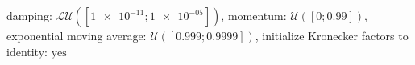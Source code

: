 damping: $\mathcal{LU}([\num[scientific-notation=true]{1e-11}; \num[scientific-notation=true]{1e-05}])$, momentum: $\mathcal{U}([\num[scientific-notation=false]{0}; \num[scientific-notation=true]{0.99}])$, exponential moving average: $\mathcal{U}([\num[scientific-notation=true]{0.999}; \num[scientific-notation=true]{0.9999}])$, initialize Kronecker factors to identity: $\text{yes}$